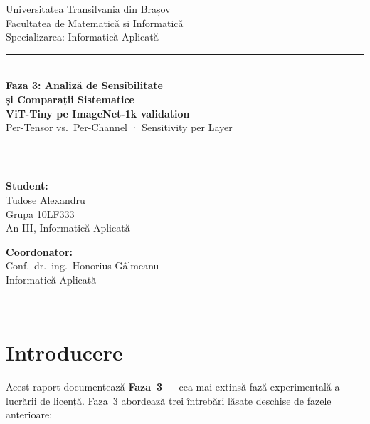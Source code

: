 \documentclass[12pt,a4paper]{article}
\begin{document}

\begin{titlepage}
  \centering
  {\large Universitatea Transilvania din Brașov\\}
  {\small Facultatea de Matematică și Informatică\\}
  {\small Specializarea: Informatică Aplicată\\[2cm]}

  \rule{\linewidth}{0.4pt}\\[0.5cm]
  {\LARGE\bfseries Faza 3: Analiză de Sensibilitate\\[0.3cm]}
  {\Large\bfseries și Comparații Sistematice\\[0.2cm]}
  {\Large\bfseries ViT-Tiny pe ImageNet-1k validation\\[0.2cm]}
  {\large Per-Tensor vs.\ Per-Channel · Sensitivity per Layer}\\[0.3cm]
  \rule{\linewidth}{0.4pt}\\[2cm]

  \begin{minipage}{0.45\textwidth}
    \textbf{Student:}\\
    Tudose Alexandru\\
    Grupa 10LF333\\
    An III, Informatică Aplicată
  \end{minipage}
  \hfill
  \begin{minipage}{0.45\textwidth}
    \raggedleft
    \textbf{Coordonator:}\\
    Conf.\ dr.\ ing.\ Honorius Gâlmeanu\\
    Informatică Aplicată
  \end{minipage}\\[3cm]

\end{titlepage}

\tableofcontents
\newpage

\section{Introducere}

Acest raport documentează \textbf{Faza~3} --- cea mai extinsă fază
experimentală a lucrării de licență. Faza~3 abordează trei întrebări
lăsate deschise de fazele anterioare:
\end{document}
